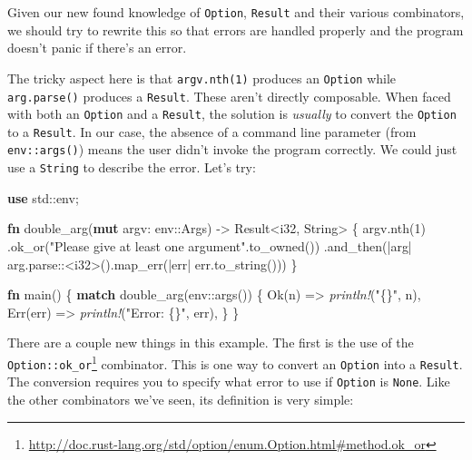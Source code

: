 \documentclass[a4paper,]{book}
\newenvironment{Shaded}{\begin{snugshade}}{\end{snugshade}}
\newcommand{\KeywordTok}[1]{\textcolor[rgb]{0.13,0.29,0.53}{\textbf{{#1}}}}
\newcommand{\DataTypeTok}[1]{\textcolor[rgb]{0.13,0.29,0.53}{{#1}}}
\newcommand{\DecValTok}[1]{\textcolor[rgb]{0.00,0.00,0.81}{{#1}}}
\newcommand{\ConstantTok}[1]{\textcolor[rgb]{0.00,0.00,0.00}{{#1}}}
\newcommand{\StringTok}[1]{\textcolor[rgb]{0.31,0.60,0.02}{{#1}}}
\newcommand{\PreprocessorTok}[1]{\textcolor[rgb]{0.56,0.35,0.01}{\textit{{#1}}}}
\newcommand{\NormalTok}[1]{{#1}}
\renewcommand{\href}[2]{#2\footnote{\url{#1}}}
\begin{document}
Given our new found knowledge of \texttt{Option}, \texttt{Result} and
their various combinators, we should try to rewrite this so that errors
are handled properly and the program doesn't panic if there's an error.

The tricky aspect here is that \texttt{argv.nth(1)} produces an
\texttt{Option} while \texttt{arg.parse()} produces a \texttt{Result}.
These aren't directly composable. When faced with both an
\texttt{Option} and a \texttt{Result}, the solution is \emph{usually} to
convert the \texttt{Option} to a \texttt{Result}. In our case, the
absence of a command line parameter (from \texttt{env::args()}) means
the user didn't invoke the program correctly. We could just use a
\texttt{String} to describe the error. Let's try:


\begin{Shaded}
\begin{Highlighting}[]
\KeywordTok{use} \NormalTok{std::env;}

\KeywordTok{fn} \NormalTok{double_arg(}\KeywordTok{mut} \NormalTok{argv: env::Args) -> }\DataTypeTok{Result}\NormalTok{<}\DataTypeTok{i32}\NormalTok{, }\DataTypeTok{String}\NormalTok{> \{}
    \NormalTok{argv.nth(}\DecValTok{1}\NormalTok{)}
        \NormalTok{.ok_or(}\StringTok{"Please give at least one argument"}\NormalTok{.to_owned())}
        \NormalTok{.and_then(|arg| arg.parse::<}\DataTypeTok{i32}\NormalTok{>().map_err(|err| err.to_string()))}
\NormalTok{\}}

\KeywordTok{fn} \NormalTok{main() \{}
    \KeywordTok{match} \NormalTok{double_arg(env::args()) \{}
        \ConstantTok{Ok}\NormalTok{(n) => }\PreprocessorTok{println!}\NormalTok{(}\StringTok{"\{\}"}\NormalTok{, n),}
        \ConstantTok{Err}\NormalTok{(err) => }\PreprocessorTok{println!}\NormalTok{(}\StringTok{"Error: \{\}"}\NormalTok{, err),}
    \NormalTok{\}}
\NormalTok{\}}
\end{Highlighting}
\end{Shaded}

There are a couple new things in this example. The first is the use of
the
\href{http://doc.rust-lang.org/std/option/enum.Option.html\#method.ok_or}{\texttt{Option::ok\_or}}
combinator. This is one way to convert an \texttt{Option} into a
\texttt{Result}. The conversion requires you to specify what error to
use if \texttt{Option} is \texttt{None}. Like the other combinators
we've seen, its definition is very simple:
\end{document}
